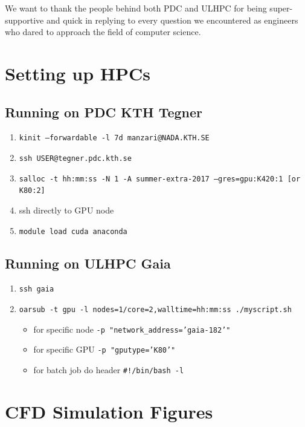 \documentclass[11pt]{article}
\begin{document}
We want to thank the people behind both PDC and ULHPC for being super-supportive and quick in replying to every question we encountered as engineers who dared to approach the field of computer science. 

\newpage

\begin{appendices}

\section{Setting up HPCs}

\subsection*{Running on PDC KTH Tegner}
\begin{enumerate}
\item \texttt{kinit --forwardable -l 7d manzari@NADA.KTH.SE}
\item \texttt{ssh USER@tegner.pdc.kth.se}
\item \texttt{salloc -t hh:mm:ss -N 1 -A summer-extra-2017 --gres=gpu:K420:1 [or K80:2]}
\item ssh directly to GPU node
\item \texttt{module load cuda anaconda}
\end{enumerate}

\subsection*{Running on ULHPC Gaia}
\begin{enumerate}
\item \texttt{ssh gaia}
\item \texttt{oarsub -t gpu -l nodes=1/core=2,walltime=hh:mm:ss ./myscript.sh}
\begin{itemize}
\item for specific node \texttt{-p "network\_address='gaia-182'"}
\item for specific GPU \texttt{-p "gputype='K80'"}
\item for batch job do header \texttt{\#!/bin/bash -l}
\end{itemize}
\end{enumerate}

\section{CFD Simulation Figures}
\label{cfd_figs}


\end{appendices}
\end{document}
